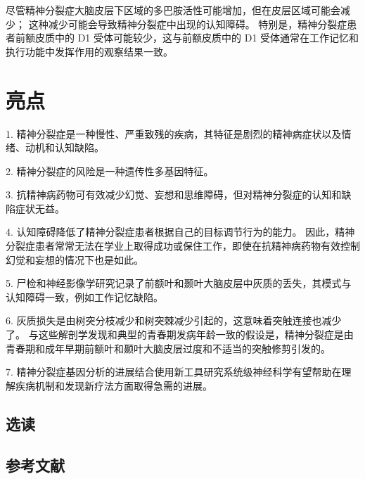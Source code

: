 尽管精神分裂症大脑皮层下区域的多巴胺活性可能增加，但在皮层区域可能会减少； 这种减少可能会导致精神分裂症中出现的认知障碍。 特别是，精神分裂症患者前额皮质中的 D1 受体可能较少，这与前额皮质中的 D1 受体通常在工作记忆和执行功能中发挥作用的观察结果一致。


\section{亮点}

1. 精神分裂症是一种慢性、严重致残的疾病，其特征是剧烈的精神病症状以及情绪、动机和认知缺陷。 

2. 精神分裂症的风险是一种遗传性多基因特征。 

3. 抗精神病药物可有效减少幻觉、妄想和思维障碍，但对精神分裂症的认知和缺陷症状无益。 

4. 认知障碍降低了精神分裂症患者根据自己的目标调节行为的能力。 因此，精神分裂症患者常常无法在学业上取得成功或保住工作，即使在抗精神病药物有效控制幻觉和妄想的情况下也是如此。 

5. 尸检和神经影像学研究记录了前额叶和颞叶大脑皮层中灰质的丢失，其模式与认知障碍一致，例如工作记忆缺陷。 

6. 灰质损失是由树突分枝减少和树突棘减少引起的，这意味着突触连接也减少了。 与这些解剖学发现和典型的青春期发病年龄一致的假设是，精神分裂症是由青春期和成年早期前额叶和颞叶大脑皮层过度和不适当的突触修剪引发的。 

7. 精神分裂症基因分析的进展结合使用新工具研究系统级神经科学有望帮助在理解疾病机制和发现新疗法方面取得急需的进展。


\subsection{选读}
\subsection{参考文献}
